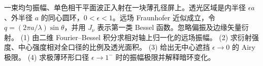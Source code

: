一束均匀振幅、单色相干平面波正入射在一块薄孔径屏上。透光区域是内半径 \(\epsilon a\)、外半径 \(a\) 的同心圆环，\(0<\epsilon<1\)。远场 Fraunhofer 近似成立，令 \(q=(2\pi a/\lambda)\sin\theta\)，并用 \(J_\nu\) 表示第一类 Bessel 函数。忽略偏振及边缘矢量衍射。
(1) 由二维 Fourier--Bessel 积分求相对轴上归一化的远场振幅。
(2) 求衍射强度、中心强度相对全口径的比例及透光面积。
(3) 给出无中心遮挡 \(\epsilon\to0\) 的 Airy 极限。
(4) 求极薄环形口径 \(\epsilon\to1^-\) 时的振幅极限并解释暗环变化。
